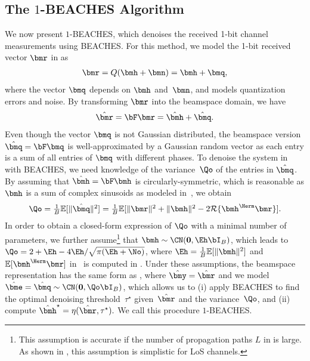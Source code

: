 \subsection{The $\textit{1}$-BEACHES Algorithm} \label{sec:1BEACHES}
%
We now present $1$-BEACHES, which denoises the received 1-bit channel measurements using BEACHES.
%
For this method, we model the 1-bit received vector $\bmr$  in    as 
\begin{align} \label{eq:1beaches_linearization}
{\bmr}=  Q(\bmh+\bmn) = \bmh + \bmq,
\end{align}
where the vector $\bmq$ depends on $\bmh$ and~$\bmn$, and models quantization errors and noise.
%
By transforming $\bmr$ into the beamspace domain, we have 
\begin{align} \label{eq:beamspace_domain_bussgang}
\hat{\bmr}= \bF \bmr = \hhat + \qhat.
\end{align}
Even though the vector $\bmq$ is not Gaussian distributed, the beamspace version $\qhat=\bF\bmq$ is well-approximated by a Gaussian random vector as each entry is a sum of all entries of $\bmq$ with different phases. 
%
To denoise the system in~ with BEACHES, we need knowledge of the variance~$\Qo$ of the entries in $\qhat$.
%
By assuming that $\hhat=\bF\bmh$ is circularly-symmetric, which is reasonable as $\bmh$ is a sum of complex sinusoids as modeled in~, we obtain   
\begin{align} \label{eq:expression0}
\textstyle \Qo =  \frac{1}{B}\smolE{\|\qhat\|^2} =  \frac{1}{B}\smolE{\|\bmr\|^2+\|\bmh\|^2-2\realpart{\bmh^\Herm\bmr}}.
\end{align}
%
In order to obtain a closed-form expression of $\Qo$ with a minimal number of parameters, we further assume\footnote{This assumption is accurate if the number of propagation paths $L$ in  is large. As shown in , this assumption is simplistic for LoS channels.} that $\bmh\sim\CN(\boldsymbol0,\Eh\bI_B)$, which leads to $\Qo = 2+\Eh-{{4\Eh}/{\sqrt{\pi({\Eh}+{\No})}}}$,
where  $\Eh=\frac{1}{B}\smolE{\|\bmh\|^2}$ and~$\smolE{\bmh^\Herm\bmr}$ in~ is computed in  . 
%
Under these assumptions, the beamspace representation  has the same form as , where 
$\yhat=\rhat$ and we model $\ehat=\qhat\sim\CN(\boldsymbol0,\Qo\bI_B)$, which allows us to (i) apply BEACHES to find the optimal denoising threshold~$\tau^\star$ given~$\rhat$ and the variance~$\Qo$, and (ii) compute $\hhatstar = \eta(\rhat,\tau^\star).$ We call this procedure $1$-BEACHES.


